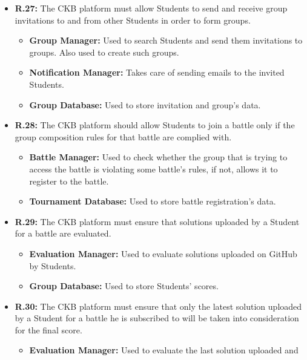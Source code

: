 \documentclass{article}
\begin{document}
{\begin{itemize}
\begin{itemize}
              \item \textbf{Group Database:} Used to store solution's data.
          \end{itemize}
    \item \textbf{R.27:} The CKB platform must allow Students to send and receive group invitations to and from
          other Students in order to form groups.
          \begin{itemize}
              \item \textbf{Group Manager:} Used to search Students and send them invitations to groups.
              Also used to create such groups.
              \item \textbf{Notification Manager:} Takes care of sending emails to the invited Students.
              \item \textbf{Group Database:} Used to store invitation and group's data.
          \end{itemize}
    \item \textbf{R.28:} The CKB platform should allow Students to join a battle only if the group composition rules
          for that battle are complied with.
          \begin{itemize}
              \item \textbf{Battle Manager:} Used to check whether the group that is trying to
              access the battle is violating some battle's rules, if not, allows it to register to
              the battle.
              \item \textbf{Tournament Database:} Used to store battle registration's data.
          \end{itemize}
    \item \textbf{R.29:} The CKB platform must ensure that solutions uploaded by a Student for a battle are evaluated.
          \begin{itemize}
              \item \textbf{Evaluation Manager:} Used to evaluate solutions uploaded on GitHub by Students.
              \item \textbf{Group Database:} Used to store Students' scores.
          \end{itemize}
    \item \textbf{R.30:} The CKB platform must ensure that only the latest solution uploaded by a Student for a battle he is subscribed to will
          be taken into consideration for the final score.
          \begin{itemize}
              \item \textbf{Evaluation Manager:} Used to evaluate the last solution uploaded and

\end{itemize}
\end{itemize}}
\end{document}
